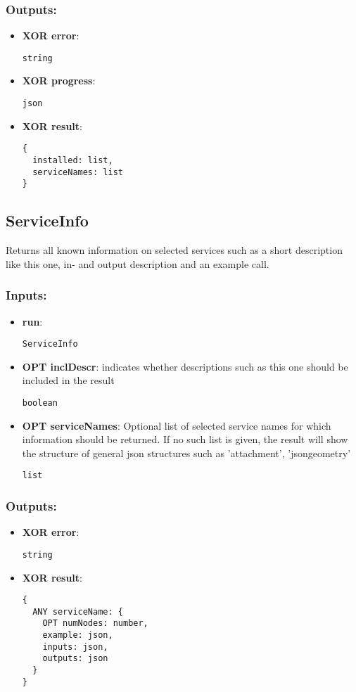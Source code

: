 \subsubsection*{Outputs:}
\begin{itemize}
    \item \textbf{XOR error}: 
\begin{lstlisting}
string
\end{lstlisting}
    \item \textbf{XOR progress}: 
\begin{lstlisting}
json
\end{lstlisting}
    \item \textbf{XOR result}: 
\begin{lstlisting}
{
  installed: list, 
  serviceNames: list
}
\end{lstlisting}
  \end{itemize}

\subsection{ServiceInfo}
\label{ch:builtinservices:ServiceInfo}
Returns
 all known information on selected services such as a short description 
like this one, in- and output description and an example call. 
\subsubsection*{Inputs:}
\begin{itemize}
    \item \textbf{run}: 
\begin{lstlisting}
ServiceInfo
\end{lstlisting}
    \item \textbf{OPT inclDescr}: indicates whether descriptions such as this one should be included in the result
\begin{lstlisting}
boolean
\end{lstlisting}
    \item \textbf{OPT serviceNames}: Optional list of selected service names for which information should  be returned. If no such list is given, the result will show the  structure of general json structures such as 'attachment',  'jsongeometry'
\begin{lstlisting}
list
\end{lstlisting}
  \end{itemize}

\subsubsection*{Outputs:}
\begin{itemize}
    \item \textbf{XOR error}: 
\begin{lstlisting}
string
\end{lstlisting}
    \item \textbf{XOR result}: 
\begin{lstlisting}
{
  ANY serviceName: {
    OPT numNodes: number, 
    example: json, 
    inputs: json, 
    outputs: json
  }
}
\end{lstlisting}
  \end{itemize}

